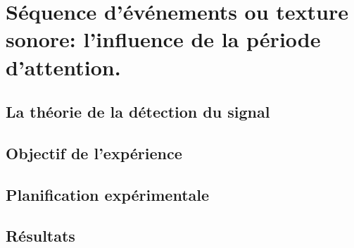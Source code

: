 \chapter{Séquence d'événements ou texture sonore: l'influence de la période d'attention.}
\label{app:xp_texture}

\section{La théorie de la détection du signal}
\label{app:sdt}

\section{Objectif de l'expérience}


\section{Planification expérimentale}


\section{Résultats}

